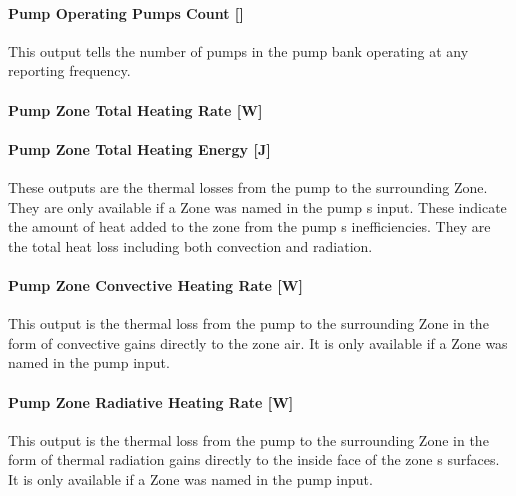 \paragraph{Pump Operating Pumps Count {[]}}\label{pump-operating-pumps-count-1}

This output tells the number of pumps in the pump bank operating at any reporting frequency.

\paragraph{Pump Zone Total Heating Rate {[}W{]}}\label{pump-zone-total-heating-rate-w-4}

\paragraph{Pump Zone Total Heating Energy {[}J{]}}\label{pump-zone-total-heating-energy-j-4}

These outputs are the thermal losses from the pump to the surrounding Zone. They are only available if a Zone was named in the pump s input. These indicate the amount of heat added to the zone from the pump s inefficiencies. They are the total heat loss including both convection and radiation.

\paragraph{Pump Zone Convective Heating Rate {[}W{]}}\label{pump-zone-convective-heating-rate-w-4}

This output is the thermal loss from the pump to the surrounding Zone in the form of convective gains directly to the zone air. It is only available if a Zone was named in the pump input.

\paragraph{Pump Zone Radiative Heating Rate {[}W{]}}\label{pump-zone-radiative-heating-rate-w-4}

This output is the thermal loss from the pump to the surrounding Zone in the form of thermal radiation gains directly to the inside face of the zone s surfaces. It is only available if a Zone was named in the pump input.